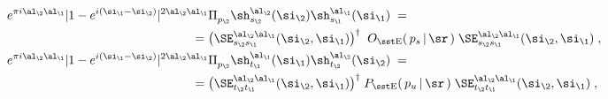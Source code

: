 \begin{equation}\label{projrepr}\begin{aligned}
e^{\pi i \al_\2\al_\1}
|1-e^{i(\si_\1-\si_\2)}|^{2\al_\2\al_\1} & \Pi_{p_\2}^{}
\sh_{s_\2}^{\al_\2}(\si_\2)  \sh_{s_\1}^{\al_\1}(\si_\1)\;=\;\\
=\;& \big(\SE^{\al_\2\al_\1}_{s_\2s_\1}(\si_\2,\si_\1)\big)^{\dagger}\;
\; O_{\rm\sst E}(\,p_s\,|\,\sr\,)\;
\SE^{\al_\2\al_\1}_{s_\2s_\1}(\si_\2,\si_\1)\;,\\
e^{\pi i \al_\2\al_\1}
|1-e^{i(\si_\1-\si_\2)}|^{2\al_\2\al_\1} & \Pi_{p_\2}^{}
\sh_{t_\1}^{\al_\1}(\si_\1)  \sh_{t_\2}^{\al_\2}(\si_\2)\;=\;\\
=\;& \big(\SE^{\al_\2\al_\1}_{t_\2t_\1}(\si_\2,\si_\1)\big)^{\dagger}\;
P_{\rm\sst E}(\,p_u\,|\,\sr\,)\;
\SE^{\al_\2\al_\1}_{t_\2t_\1}(\si_\2,\si_\1)\;,
\end{aligned}\end{equation}

